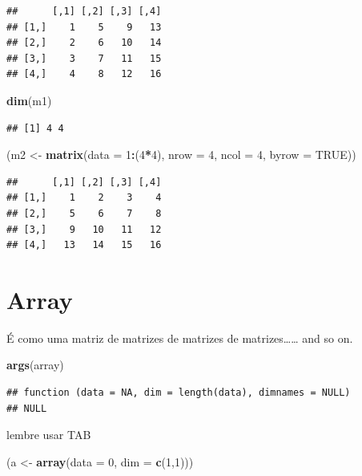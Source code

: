 \documentclass[]{book}
\newenvironment{Shaded}{\begin{snugshade}}{\end{snugshade}}
\newcommand{\KeywordTok}[1]{\textcolor[rgb]{0.13,0.29,0.53}{\textbf{#1}}}
\newcommand{\DataTypeTok}[1]{\textcolor[rgb]{0.13,0.29,0.53}{#1}}
\newcommand{\DecValTok}[1]{\textcolor[rgb]{0.00,0.00,0.81}{#1}}
\newcommand{\StringTok}[1]{\textcolor[rgb]{0.31,0.60,0.02}{#1}}
\newcommand{\OtherTok}[1]{\textcolor[rgb]{0.56,0.35,0.01}{#1}}
\newcommand{\OperatorTok}[1]{\textcolor[rgb]{0.81,0.36,0.00}{\textbf{#1}}}
\newcommand{\NormalTok}[1]{#1}
\theoremstyle{definition}
\theoremstyle{definition}
\theoremstyle{definition}
\theoremstyle{remark}
\begin{document}
\begin{verbatim}
##      [,1] [,2] [,3] [,4]
## [1,]    1    5    9   13
## [2,]    2    6   10   14
## [3,]    3    7   11   15
## [4,]    4    8   12   16
\end{verbatim}

\begin{Shaded}
\begin{Highlighting}[]
\KeywordTok{dim}\NormalTok{(m1)}
\end{Highlighting}
\end{Shaded}

\begin{verbatim}
## [1] 4 4
\end{verbatim}

\begin{Shaded}
\begin{Highlighting}[]
\NormalTok{(m2 <-}\StringTok{ }\KeywordTok{matrix}\NormalTok{(}\DataTypeTok{data =} \DecValTok{1}\OperatorTok{:}\NormalTok{(}\DecValTok{4}\OperatorTok{*}\DecValTok{4}\NormalTok{), }\DataTypeTok{nrow =} \DecValTok{4}\NormalTok{, }\DataTypeTok{ncol =} \DecValTok{4}\NormalTok{, }\DataTypeTok{byrow =} \OtherTok{TRUE}\NormalTok{))}
\end{Highlighting}
\end{Shaded}

\begin{verbatim}
##      [,1] [,2] [,3] [,4]
## [1,]    1    2    3    4
## [2,]    5    6    7    8
## [3,]    9   10   11   12
## [4,]   13   14   15   16
\end{verbatim}

\section{Array}\label{array}

É como uma matriz de matrizes de matrizes de matrizes\ldots{}\ldots{}
and so on.

\begin{Shaded}
\begin{Highlighting}[]
\KeywordTok{args}\NormalTok{(array)}
\end{Highlighting}
\end{Shaded}

\begin{verbatim}
## function (data = NA, dim = length(data), dimnames = NULL) 
## NULL
\end{verbatim}

lembre usar TAB

\begin{Shaded}
\begin{Highlighting}[]
\NormalTok{(a <-}\StringTok{ }\KeywordTok{array}\NormalTok{(}\DataTypeTok{data =} \DecValTok{0}\NormalTok{, }\DataTypeTok{dim =} \KeywordTok{c}\NormalTok{(}\DecValTok{1}\NormalTok{,}\DecValTok{1}\NormalTok{)))}
\end{Highlighting}
\end{Shaded}
\end{document}
